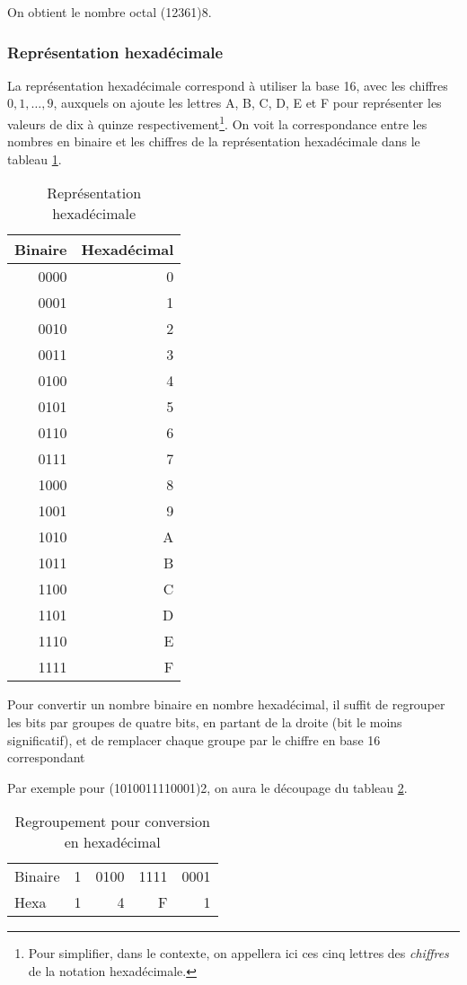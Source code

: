 \documentclass[11pt]{article}
\begin{document}
On obtient le nombre octal (12361)8.

\subsubsection{Représentation hexadécimale}
\label{sec:org9494b83}

La représentation hexadécimale correspond à utiliser la base 16, avec
les chiffres \(0, 1, \ldots, 9\), auxquels on ajoute les lettres A, B,
C, D, E et F pour représenter les valeurs de dix à quinze
respectivement\footnote{Pour simplifier, dans le contexte, on appellera ici ces cinq
lettres des \emph{chiffres} de la notation hexadécimale.}. On voit la correspondance entre les nombres en binaire et les chiffres de la représentation hexadécimale dans le tableau \ref{tab:org3120ed4}.

\begin{table}[htbp]
\caption{\label{tab:org3120ed4}Représentation hexadécimale}
\centering
\begin{tabular}{rr}
Binaire & Hexadécimal\\
\hline
0000 & 0\\
0001 & 1\\
0010 & 2\\
0011 & 3\\
0100 & 4\\
0101 & 5\\
0110 & 6\\
0111 & 7\\
1000 & 8\\
1001 & 9\\
1010 & A\\
1011 & B\\
1100 & C\\
1101 & D\\
1110 & E\\
1111 & F\\
\end{tabular}
\end{table}


Pour convertir un nombre binaire en nombre hexadécimal, il suffit de
regrouper les bits par groupes de quatre bits, en partant de la droite
(bit le moins significatif), et de remplacer chaque groupe par le
chiffre en base 16 correspondant

Par exemple pour (1010011110001)2, on aura le découpage du tableau
\ref{tab:org0d02acc}.

\begin{table}[htbp]
\caption{\label{tab:org0d02acc}Regroupement pour conversion en hexadécimal}
\centering
\begin{tabular}{lrrrr}
 &  &  &  & \\
\hline
Binaire & 1 & 0100 & 1111 & 0001\\
Hexa & 1 & 4 & F & 1\\
\end{tabular}
\end{table}
\end{document}
